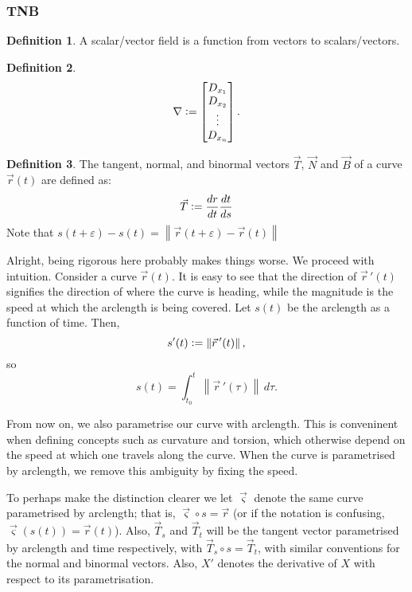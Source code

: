 \documentclass{article}
\newcommand{\vc}{\vcentcolon}
\theoremstyle{definition}
\newtheorem{defn}{Definition}[subsubsection]
\begin{document}
\subsubsection{TNB}
\begin{defn}
	A scalar/vector field is a function from vectors to scalars/vectors.
\end{defn}
\begin{defn}
	\[\nabla\vc=\begin{bmatrix}D_{x_1}\\D_{x_2}\\\vdots\\D_{x_n}\end{bmatrix}.\]
\end{defn}
\begin{defn}
	The tangent, normal, and binormal vectors $\vec T$, $\vec N$ and $\vec B$ of a curve $\vec r(t)$ are defined as:
	\begin{align*}
		\vec T\vc=\frac{dr}{dt}\frac{dt}{ds}
	\end{align*}
	Note that $s(t+\varepsilon)-s(t)=\left\lVert\vec r(t+\varepsilon)-\vec r(t)\right\rVert$
\end{defn}
Alright, being rigorous here probably makes things worse. We proceed with intuition.
Consider a curve $\vec r(t)$. It is easy to see that the direction of $\vec r\,'(t)$ signifies the direction of where the curve is heading, while the magnitude is the speed at which the arclength is being covered. Let $s(t)$ be the arclength as a function of time. Then, 
\[s'(t)\vc=\left\lVert\vec r\,'(t)\right\rVert,\] 
so 
\[s(t)=\int_{t_0}^t\left\lVert\vec r\,'(\tau)\right\rVert\,d\tau.\]\par
From now on, we also parametrise our curve with arclength. This is conveninent when defining concepts such as curvature and torsion, which otherwise depend on the speed at which one travels along the curve. When the curve is parametrised by arclength, we remove this ambiguity by fixing the speed.\par
To perhaps make the distinction clearer we let $\vec\varsigma$ denote the same curve parametrised by arclength; that is, $\vec\varsigma\circ s=\vec r$ (or if the notation is confusing, $\vec\varsigma(s(t))=\vec r(t)$). Also, $\vec T_s$ and $\vec T_t$ will be the tangent vector parametrised by arclength and time respectively, with $\vec T_s\circ s=\vec T_t$, with similar conventions for the normal and binormal vectors. Also, $X'$ denotes the derivative of $X$ with respect to its parametrisation.\par
\end{document}
